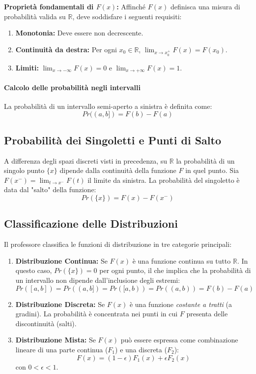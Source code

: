 \documentclass[12pt, a4paper]{article}
\begin{document}
\textbf{Proprietà fondamentali di $F(x)$:}
Affinché $F(x)$ definisca una misura di probabilità valida su $\mathbb{R}$, deve soddisfare i seguenti requisiti:
\begin{enumerate}
    \item \textbf{Monotonia:} Deve essere non decrescente.
    \item \textbf{Continuità da destra:} Per ogni $x_0 \in \mathbb{R}$, $\lim_{x \to x_0^+} F(x) = F(x_0)$.
    \item \textbf{Limiti:} $\lim_{x \to -\infty} F(x) = 0$ e $\lim_{x \to +\infty} F(x) = 1$.
\end{enumerate}

\paragraph{Calcolo delle probabilità negli intervalli}
La probabilità di un intervallo semi-aperto a sinistra è definita come:
$$ Pr((a, b]) = F(b) - F(a) $$

\subsection{Probabilità dei Singoletti e Punti di Salto}
A differenza degli spazi discreti visti in precedenza, su $\mathbb{R}$ la probabilità di un singolo punto $\{x\}$ dipende dalla continuità della funzione $F$ in quel punto.
Sia $F(x^-) = \lim_{t \to x^-} F(t)$ il limite da sinistra. La probabilità del singoletto è data dal "salto" della funzione:
$$ Pr(\{x\}) = F(x) - F(x^-) $$

\subsection{Classificazione delle Distribuzioni}
Il professore classifica le funzioni di distribuzione in tre categorie principali:

\begin{enumerate}
    \item \textbf{Distribuzione Continua:} Se $F(x)$ è una funzione continua su tutto $\mathbb{R}$. 
    In questo caso, $Pr(\{x\}) = 0$ per ogni punto, il che implica che la probabilità di un intervallo non dipende dall'inclusione degli estremi:
    $$ Pr([a, b]) = Pr((a, b]) = Pr([a, b)) = Pr((a, b)) = F(b) - F(a) $$
    
    \item \textbf{Distribuzione Discreta:} Se $F(x)$ è una funzione \textit{costante a tratti} (a gradini). La probabilità è concentrata nei punti in cui $F$ presenta delle discontinuità (salti).
    
    \item \textbf{Distribuzione Mista:} Se $F(x)$ può essere espressa come combinazione lineare di una parte continua ($F_1$) e una discreta ($F_2$):
    $$ F(x) = (1 - \epsilon)F_1(x) + \epsilon F_2(x) $$
    con $0 < \epsilon < 1$.
\end{enumerate}
\end{document}

